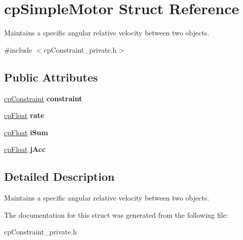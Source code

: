 \hypertarget{structcp_simple_motor}{}\section{cp\+Simple\+Motor Struct Reference}
\label{structcp_simple_motor}


Maintains a specific angular relative velocity between two objects.  




{\ttfamily \#include $<$cp\+Constraint\+\_\+private.\+h$>$}

\subsection*{Public Attributes}
\begin{DoxyCompactItemize}
\item 
\hypertarget{structcp_simple_motor_a361cbe14d173459992b77702f9a94310}{}\hyperlink{structcp_constraint}{cp\+Constraint} {\bfseries constraint}\label{structcp_simple_motor_a361cbe14d173459992b77702f9a94310}

\item 
\hypertarget{structcp_simple_motor_afca80c08d35ea3b62c740c855eb50116}{}\hyperlink{group__basic_types_gac1ed65573e035bf892505768c852d8d3}{cp\+Float} {\bfseries rate}\label{structcp_simple_motor_afca80c08d35ea3b62c740c855eb50116}

\item 
\hypertarget{structcp_simple_motor_adda289d079a35a95e84b45f62f046cae}{}\hyperlink{group__basic_types_gac1ed65573e035bf892505768c852d8d3}{cp\+Float} {\bfseries i\+Sum}\label{structcp_simple_motor_adda289d079a35a95e84b45f62f046cae}

\item 
\hypertarget{structcp_simple_motor_ac1ff742b93d07fe04d1d6a9590415e68}{}\hyperlink{group__basic_types_gac1ed65573e035bf892505768c852d8d3}{cp\+Float} {\bfseries j\+Acc}\label{structcp_simple_motor_ac1ff742b93d07fe04d1d6a9590415e68}

\end{DoxyCompactItemize}


\subsection{Detailed Description}
Maintains a specific angular relative velocity between two objects. 

The documentation for this struct was generated from the following file\+:\begin{DoxyCompactItemize}
\item 
cp\+Constraint\+\_\+private.\+h\end{DoxyCompactItemize}
